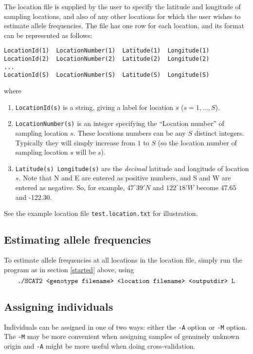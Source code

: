 \documentclass[11pt,titlepage,times,letterpaper]{article}
\begin{document}
The location file is supplied by the user to specify the latitude and
longitude of sampling locations, and also of any other locations
for which the user wishes to estimate allele frequencies.
The file has one row for each location, and its format 
can be represented as follows:
\begin{verbatim}
LocationId(1)  LocationNumber(1)  Latitude(1)  Longitude(1)
LocationId(2)  LocationNumber(2)  Latitude(2)  Longitude(2)
...
LocationId(S)  LocationNumber(S)  Latitude(S)  Longitude(S)
\end{verbatim}
where
\begin{enumerate}
\item{\tt LocationId(s)} is a string, giving a label for location $s$
($s = 1,\dots,S$).
\item{\tt LocationNumber(s)} is an integer specifying the ``Location
number'' of sampling location $s$. These locations numbers can be
any $S$ distinct integers. Typically they will simply increase from $1$ to $S$
(so the location number of sampling location $s$ will be $s$). 
\item{{\tt Latitude(s) Longitude(s)}} are the {\it decimal} latitude
and longitude of location $s$. Note that N and E are entered as
positive numbers, and S and W are entered as negative. So, for
example, $47^\circ 39' N$ and $122^\circ 18' W$ become 47.65 and -122.30.
\end{enumerate}
See the example location file {\tt test.location.txt} for illustration.

\subsection{Estimating allele frequencies}

To estimate allele frequencies at all locations in the location
file, simply run the program as in section \ref{started} above,
using
$$\text{{\tt ./SCAT2 <genotype filename> <location filename> <outputdir> L}}$$

\subsection{Assigning individuals}  \label{assign}

Individuals can be assigned in one of two ways: either the {\tt -A} option or {\tt -M} option.
The {\tt -M}  may be more convenient when assigning samples of genuinely 
unknown origin and  {\tt -A} might be more useful when doing cross-validation.
\end{document}
